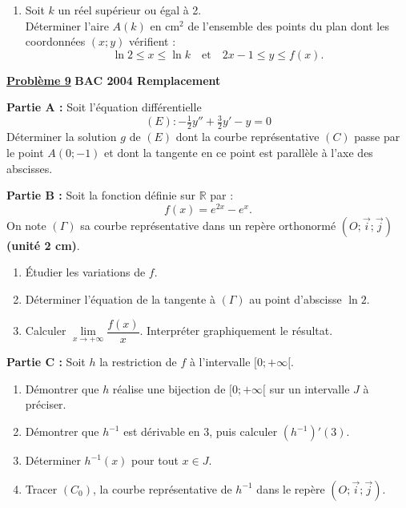 \documentclass[12pt,a4paper]{article}
\newcommand{\exo}[1]{%
        \textbf{\underline{Problème #1}}
}
\begin{document}
\begin{multicols}{2}
\begin{enumerate}
\begin{enumerate}
        \item Soit \( k \) un réel supérieur ou égal à 2.\\
        Déterminer l’aire \( A(k) \) en \( \text{cm}^2 \) de l’ensemble des points du plan dont les coordonnées \( (x ; y) \) vérifient :
        \[
        \ln 2 \leq x \leq \ln k \quad \text{et} \quad 2x - 1 \leq y \leq f(x).
        \]
\end{enumerate}

\end{enumerate}

\exo{9} \textbf{BAC 2004 Remplacement}

\textbf{Partie A :} Soit l’équation différentielle
\[
(E) : -\tfrac{1}{2}y'' + \tfrac{3}{2}y' - y = 0
\]
Déterminer la solution \( g \) de \( (E) \) dont la courbe représentative \( (C) \) passe par le point \( A(0 ; -1) \) et dont la tangente en ce point est parallèle à l’axe des abscisses.

\textbf{Partie B :} Soit la fonction définie sur \( \mathbb{R} \) par :
\[
f(x) = e^{2x} - e^x.
\]
On note \( (\Gamma) \) sa courbe représentative dans un repère orthonormé \( (O ; \vec{i} ; \vec{j}) \) \textbf{(unité 2 cm)}.

\begin{enumerate}
    \item Étudier les variations de \( f \).
    \item Déterminer l’équation de la tangente à \( (\Gamma) \) au point d’abscisse \( \ln 2 \).
    \item Calculer \( \lim\limits_{x \to +\infty} \dfrac{f(x)}{x} \). Interpréter graphiquement le résultat.
\end{enumerate}

\textbf{Partie C :} Soit \( h \) la restriction de \( f \) à l’intervalle \( [0 ; +\infty[ \).

\begin{enumerate}
    \item Démontrer que \( h \) réalise une bijection de \( [0 ; +\infty[ \) sur un intervalle \( J \) à préciser.
    \item Démontrer que \( h^{-1} \) est dérivable en \( 3 \), puis calculer \( (h^{-1})'(3) \).
    \item Déterminer \( h^{-1}(x) \) pour tout \( x \in J \).
    \item Tracer \( (C_0) \), la courbe représentative de \( h^{-1} \) dans le repère \( (O ; \vec{i} ; \vec{j}) \).
\end{enumerate}


\end{multicols}
\end{document}
